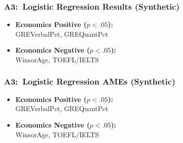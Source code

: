 \documentclass[12pt, aspectratio=169]{beamer}
\begin{document}
\begin{frame}[label=lrrs]
\frametitle{A3:\ Logistic Regression Results (Synthetic)}
\centering
\renewcommand{\thetable}{\arabic{table}a}
\vspace{-7.5pt}
\begin{minipage}[t]{0.3\textwidth}
\end{minipage}%
\hfill
\begin{minipage}[c][0.8\textheight][c]{0.7\textwidth}
\begin{itemize}
\item \textbf{Economics Positive ($p<.05$):}\ \\ GREVerbalPct, GREQuantPct
\vspace{10pt}
\item \textbf{Economics Negative ($p<.05$):}\ \\ WinsorAge, TOEFL/IELTS
\end{itemize}
\end{minipage}
\raggedright
\hyperlink{pllra}{}
\end{frame}

\begin{frame}[label=lras]
\frametitle{A3:\ Logistic Regression AMEs (Synthetic)}
\addtocounter{framenumber}{-1}
\centering
\addtocounter{table}{-1}
\renewcommand{\thetable}{\arabic{table}b}
\vspace{-7.5pt}
\begin{minipage}[t]{0.3\textwidth}
\end{minipage}%
\hfill
\begin{minipage}[c][0.8\textheight][c]{0.7\textwidth}
\begin{itemize}
\item \textbf{Economics Positive ($p<.05$):}\ \\ GREVerbalPct, GREQuantPct
\vspace{10pt}
\item \textbf{Economics Negative ($p<.05$):}\ \\ WinsorAge, TOEFL/IELTS
\end{itemize}
\end{minipage}
\raggedright
\hyperlink{pllra}{}
\end{frame}
\end{document}
